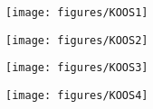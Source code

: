 \begin{figure} [H]
\centering
\texttt{[image: figures/KOOS1]}
\end{figure}

\begin{figure} [H]
\centering
\texttt{[image: figures/KOOS2]}
\end{figure}


\begin{figure} [H]
\centering
\texttt{[image: figures/KOOS3]}
\end{figure}


\begin{figure} [H]
\centering
\texttt{[image: figures/KOOS4]}
\end{figure}
